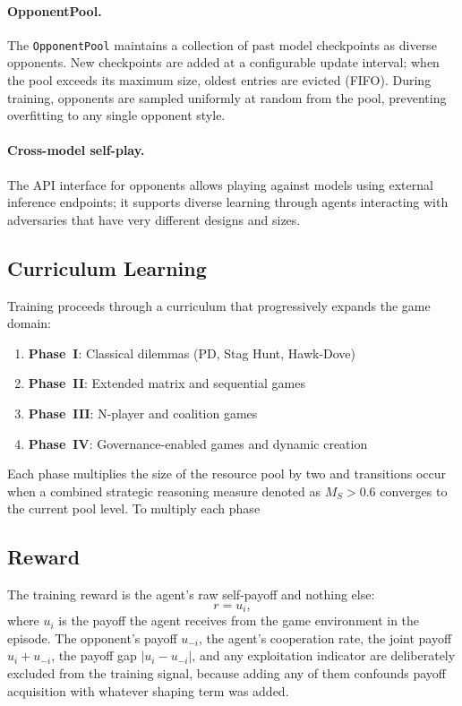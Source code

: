 \paragraph{OpponentPool.}
The \texttt{OpponentPool} maintains a collection of past model checkpoints
as diverse opponents. New checkpoints are added at a configurable update
interval; when the pool exceeds its maximum size, oldest entries are evicted
(FIFO). During training, opponents are sampled uniformly at random from the
pool, preventing overfitting to any single opponent style.

\paragraph{Cross-model self-play.}
The API interface for opponents allows playing against models using external inference endpoints; it supports diverse learning through agents interacting with adversaries that have very different designs and sizes.

\subsection{Curriculum Learning}
\label{sec:curriculum}

Training proceeds through a curriculum that progressively expands the game
domain:

\begin{enumerate}[nosep]
    \item \textbf{Phase~I}: Classical dilemmas (PD, Stag Hunt, Hawk-Dove)
    \item \textbf{Phase~II}: Extended matrix and sequential games
    \item \textbf{Phase~III}: N-player and coalition games
    \item \textbf{Phase~IV}: Governance-enabled games and dynamic creation
\end{enumerate}

Each phase multiplies the size of the resource pool by two and transitions occur when a combined strategic reasoning measure denoted as $M_S > 0.6$ converges to the current pool level. To multiply each phase

\subsection{Reward}
\label{sec:reward-shaping}

The training reward is the agent's raw self-payoff and nothing else:
\[
r = u_i,
\]
where $u_i$ is the payoff the agent receives from the game environment in
the episode. The opponent's payoff $u_{-i}$, the agent's cooperation rate,
the joint payoff $u_i + u_{-i}$, the payoff gap $|u_i - u_{-i}|$, and any
exploitation indicator are deliberately excluded from the training signal,
because adding any of them confounds payoff acquisition with whatever
shaping term was added.

